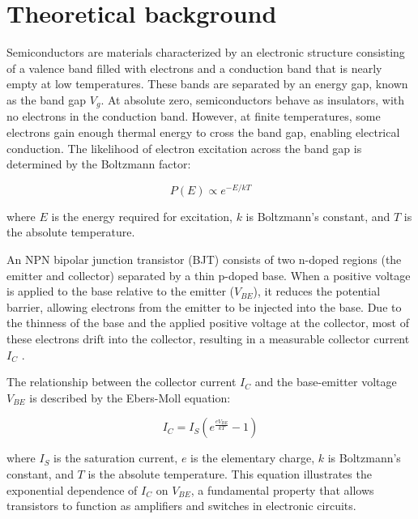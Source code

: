 \documentclass[12pt,letterpaper,twocolumn]{article}
\begin{document}

\section{Theoretical background}

Semiconductors are materials characterized by an electronic structure consisting of a valence band filled with electrons and a conduction band that is nearly empty at low temperatures. These bands are separated by an energy gap, known as the band gap \( V_g \). At absolute zero, semiconductors behave as insulators, with no electrons in the conduction band. However, at finite temperatures, some electrons gain enough thermal energy to cross the band gap, enabling electrical conduction. The likelihood of electron excitation across the band gap is determined by the Boltzmann factor:

\begin{equation}\label{eq3}
P(E) \propto e^{-E/kT}
\end{equation}

where \( E \) is the energy required for excitation, \( k \) is Boltzmann’s constant, and \( T \) is the absolute temperature\cite{Thornton}.

An NPN bipolar junction transistor (BJT) consists of two n-doped regions (the emitter and collector) separated by a thin p-doped base. When a positive voltage is applied to the base relative to the emitter (\( V_{BE} \)), it reduces the potential barrier, allowing electrons from the emitter to be injected into the base. Due to the thinness of the base and the applied positive voltage at the collector, most of these electrons drift into the collector, resulting in a measurable collector current \( I_C \) \cite{Neudeck}.

The relationship between the collector current \( I_C \) and the base-emitter voltage \( V_{BE} \) is described by the Ebers-Moll equation:

\begin{equation}\label{eq4}
I_C = I_S \left(e^{\frac{eV_{BE}}{kT}} - 1\right)
\end{equation}

where \( I_S \) is the saturation current, \( e \) is the elementary charge, \( k \) is Boltzmann’s constant, and \( T \) is the absolute temperature. This equation illustrates the exponential dependence of \( I_C \) on \( V_{BE} \), a fundamental property that allows transistors to function as amplifiers and switches in electronic circuits\cite{Neudeck}.
\end{document}
